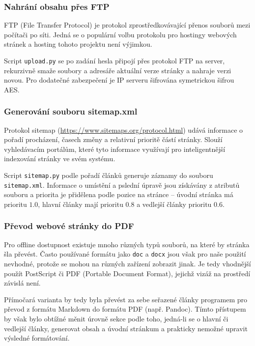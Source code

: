 \documentclass[a4paper, 12pt]{article}
\begin{document}
  \subsubsection{Nahrání obsahu přes FTP}
  FTP (File Transfer Protocol) je protokol zprostředkovávající přenos souborů mezi počítači po síti. Jedná se o populární volbu protokolu pro hostingy webových stránek a hosting tohoto projektu není výjimkou.

  Script \texttt{upload.py} se po zadání hesla připojí přes protokol FTP na server, rekurzivně smaže soubory a adresáře aktuální verze stránky a nahraje verzi novou. Pro dodatečné zabezpečení je IP serveru šifrována symetrickou šifrou AES.


  \subsubsection{Generování souboru sitemap.xml}
  Protokol sitemap (\url{https://www.sitemaps.org/protocol.html}) udává informace o pořadí procházení, časech změny a relativní prioritě částí stránky. Slouží vyhledávacím portálům, které tyto informace využívají pro inteligentnější indexování stránky ve svém systému.

  Script \texttt{sitemap.py} podle pořadí článků generuje záznamy do souboru \texttt{sitemap.xml}. Informace o umístění a pslední úpravě jsou získávány z atributů souboru a priorita je přidělena podle pozice na stránce -- úvodní stránka má prioritu $1.0$, hlavní články mají prioritu $0.8$ a vedlejší články prioritu $0.6$.


  \subsubsection{Převod webové stránky do PDF} \label{sec:Převod webové stránky do PDF}
  Pro offline dostupnost existuje mnoho různých typů souborů, na které by stránka šla převést. Často používané formátu jako \texttt{doc} a \texttt{docx} jsou však pro naše použití nevhodné, protože se mohou na různých zařízení zobrazit jinak. Je tedy vhodnější použít PostScript či PDF (Portable Document Format), jejichž vizáž na prostředí závislá není\cite{history-of-pdf}.

  Přímočará varianta by tedy byla převést za sebe seřazené články programem pro převod z formátu Markdown do formátu PDF (např. Pandoc). Tímto přístupem by však bylo obtížné měnit úrovně sekce podle toho, jedná-li se o hlavní či vedlejší články, generovat obsah a úvodní stránkum a prakticky nemožné upravit výsledné formátování.
\end{document}
